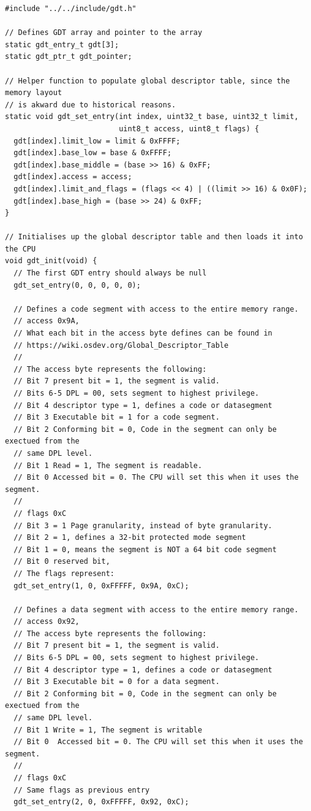 \documentclass[../main.tex]{subfiles}
\begin{document}
\begin{listing}[H]
    \begin{verbatim}
#include "../../include/gdt.h"

// Defines GDT array and pointer to the array
static gdt_entry_t gdt[3];
static gdt_ptr_t gdt_pointer;

// Helper function to populate global descriptor table, since the memory layout
// is akward due to historical reasons.
static void gdt_set_entry(int index, uint32_t base, uint32_t limit,
                          uint8_t access, uint8_t flags) {
  gdt[index].limit_low = limit & 0xFFFF;
  gdt[index].base_low = base & 0xFFFF;
  gdt[index].base_middle = (base >> 16) & 0xFF;
  gdt[index].access = access;
  gdt[index].limit_and_flags = (flags << 4) | ((limit >> 16) & 0x0F);
  gdt[index].base_high = (base >> 24) & 0xFF;
}

// Initialises up the global descriptor table and then loads it into the CPU
void gdt_init(void) {
  // The first GDT entry should always be null
  gdt_set_entry(0, 0, 0, 0, 0);

  // Defines a code segment with access to the entire memory range.
  // access 0x9A,
  // What each bit in the access byte defines can be found in
  // https://wiki.osdev.org/Global_Descriptor_Table
  //
  // The access byte represents the following:
  // Bit 7 present bit = 1, the segment is valid.
  // Bits 6-5 DPL = 00, sets segment to highest privilege.
  // Bit 4 descriptor type = 1, defines a code or datasegment
  // Bit 3 Executable bit = 1 for a code segment.
  // Bit 2 Conforming bit = 0, Code in the segment can only be exectued from the
  // same DPL level.
  // Bit 1 Read = 1, The segment is readable.
  // Bit 0 Accessed bit = 0. The CPU will set this when it uses the segment.
  //
  // flags 0xC
  // Bit 3 = 1 Page granularity, instead of byte granularity.
  // Bit 2 = 1, defines a 32-bit protected mode segment
  // Bit 1 = 0, means the segment is NOT a 64 bit code segment
  // Bit 0 reserved bit,
  // The flags represent:
  gdt_set_entry(1, 0, 0xFFFFF, 0x9A, 0xC);

  // Defines a data segment with access to the entire memory range.
  // access 0x92,
  // The access byte represents the following:
  // Bit 7 present bit = 1, the segment is valid.
  // Bits 6-5 DPL = 00, sets segment to highest privilege.
  // Bit 4 descriptor type = 1, defines a code or datasegment
  // Bit 3 Executable bit = 0 for a data segment.
  // Bit 2 Conforming bit = 0, Code in the segment can only be exectued from the
  // same DPL level.
  // Bit 1 Write = 1, The segment is writable
  // Bit 0  Accessed bit = 0. The CPU will set this when it uses the segment.
  //
  // flags 0xC
  // Same flags as previous entry
  gdt_set_entry(2, 0, 0xFFFFF, 0x92, 0xC);


\end{verbatim}
\end{listing}
\end{document}
